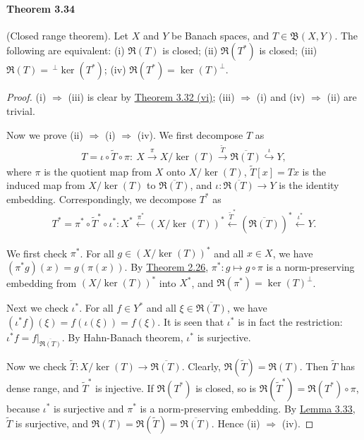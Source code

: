\documentclass{article}
\begin{document}
\paragraph{Theorem 3.34\label{thm:3.34}} (Closed range theorem). Let $X$ and $Y$ be Banach spaces, and $T\in\mathfrak{B}(X,Y)$. The following are equivalent: (i) $\mathfrak{R}(T)$ is closed; (ii) $\mathfrak{R}(T^*)$ is closed; (iii) $\mathfrak{R}(T)=\,^\perp\ker(T^*)$; (iv) $\mathfrak{R}(T^*) = \ker(T)^\perp$.
\begin{proof}
(i) $\Rightarrow$ (iii) is clear by \hyperref[thm:3.32]{Theorem 3.32 (vi)}; (iii) $\Rightarrow$ (i) and (iv) $\Rightarrow$ (ii) are trivial.

Now we prove (ii) $\Rightarrow$ (i) $\Rightarrow$ (iv). We first decompose $T$ as
\begin{align*}
	T=\iota\circ\widetilde{T}\circ\pi:\ X\overset{\pi}{\longrightarrow}X/\ker(T)\overset{\widetilde{T}}{\longrightarrow} \overline{\mathfrak{R}(T)}\overset{\iota}{\hookrightarrow} Y,
\end{align*}
where $\pi$ is the quotient map from $X$ onto $X/\ker(T)$, $\widetilde{T}[x]=Tx$ is the induced map from $X/\ker(T)$ to $\overline{\mathfrak{R}(T)}$, and $\iota:\overline{\mathfrak{R}(T)}\to Y$ is the identity embedding. Correspondingly, we decompose $T^*$ as
\begin{align*}
	T^* = \pi^*\circ \widetilde{T}^*\circ\iota^*: X^*\overset{\pi^*}{\longleftarrow}(X/\ker(T))^*\overset{\widetilde{T}^*}{\longleftarrow}\left(\overline{\mathfrak{R}(T)}\right)^*\overset{\iota^*}{\longleftarrow} Y.
\end{align*}

We first check $\pi^*$. For all $g\in(X/\ker(T))^*$ and all $x\in X$, we have $(\pi^* g)(x) = g(\pi(x))$. By \hyperref[thm:2.26]{Theorem 2.26}, $\pi^*:g\mapsto g\circ\pi$ is a norm-preserving embedding from $(X/\ker(T))^*$ into $X^*$, and $\mathfrak{R}(\pi^*)=\ker(T)^\perp$.

Next we check $\iota^*$. For all $f\in Y^*$ and all $\xi\in\overline{\mathfrak{R}(T)}$, we have $(\iota^*f)(\xi) = f(\iota(\xi)) = f(\xi)$. It is seen that $\iota^*$ is in fact the restriction: $\iota^* f=f|_{\overline{\mathfrak{R}(T)}}$. By Hahn-Banach theorem, $\iota^*$ is surjective.

Now we check $\widetilde{T}:X/\ker(T)\to\overline{\mathfrak{R}(T)}$. Clearly, $\mathfrak{R}(\widetilde{T})=\mathfrak{R}(T)$. Then $\widetilde{T}$ has dense range, and $\widetilde{T}^*$ is injective.
If $\mathfrak{R}(T^*)$ is closed, so is $\mathfrak{R}(\widetilde{T}^*)=\mathfrak{R}(T^*)\circ\pi$, because $\iota^*$ is surjective and $\pi^*$ is a norm-preserving embedding. By \hyperref[lemma:3.33]{Lemma 3.33}, $\widetilde{T}$ is surjective, and $\mathfrak{R}(T) = \mathfrak{R}(\widetilde{T}) = \overline{\mathfrak{R}(T)}$. Hence (ii) $\Rightarrow$ (iv).


\end{proof}
\end{document}
